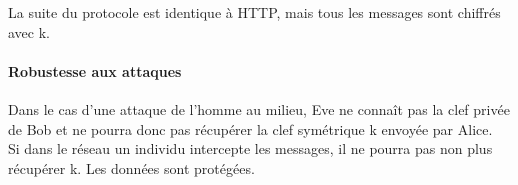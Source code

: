 La suite du protocole est identique à HTTP, mais tous les messages sont chiffrés avec k.

\paragraph{Robustesse aux attaques \\}
Dans le cas d'une attaque de l'homme au milieu, Eve ne connaît pas la clef privée de Bob et ne pourra donc pas récupérer la clef symétrique k envoyée par Alice. \\
Si dans le réseau un individu intercepte les messages, il ne pourra pas non plus récupérer k. Les données sont protégées. 
